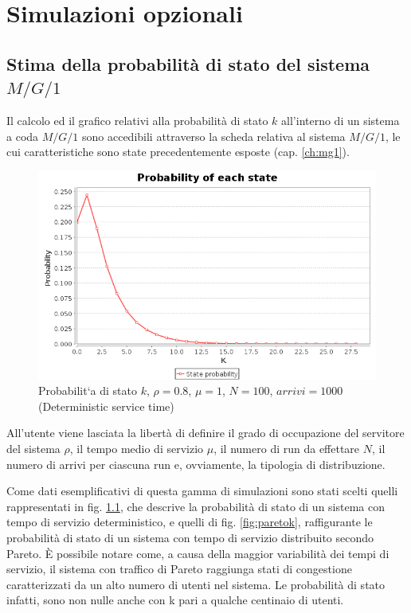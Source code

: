 \chapter{Simulazioni opzionali}
\label{ch:optional}

\section{Stima della probabilit\`a di stato del sistema $M/G/1$}

Il calcolo ed il grafico relativi alla probabilit\`a di stato $k$ all'interno di un sistema a coda $M/G/1$ sono accedibili attraverso la scheda relativa al sistema $M/G/1$, le cui caratteristiche sono state precedentemente esposte (cap. \ref{ch:mg1}).

\begin{figure}[!h]{
	\begin{center}
	   \includegraphics[width=\textwidth]{figures/mg1k.png}
	\end{center}}
	\caption{Probabilit`a di stato $k$, $\rho=0.8$, $\mu=1$, $N=100$, $arrivi=1000$ (Deterministic service time) }
	\label{fig:mg1k}
\end{figure}

All'utente viene lasciata la libert\`a di definire il grado di occupazione del servitore del sistema $\rho$, il tempo medio di servizio $\mu$, il numero di run da effettare $N$, il numero di arrivi per ciascuna run e, ovviamente, la tipologia di distribuzione. 

Come dati esemplificativi di questa gamma di simulazioni sono stati scelti quelli rappresentati in fig. \ref{fig:mg1k}, che descrive la probabilit\`a di stato di un sistema con tempo di servizio deterministico, e quelli di fig. \ref{fig:paretok}, raffigurante le probabilit\`a di stato di un sistema con tempo di servizio distribuito secondo Pareto.
\`E possibile notare come, a causa della maggior variabilit\`a dei tempi di servizio, il sistema con traffico di Pareto raggiunga stati di congestione caratterizzati da un alto numero di utenti nel sistema. Le probabilit\`a di stato infatti, sono non nulle anche con k pari a qualche centinaio di utenti.

